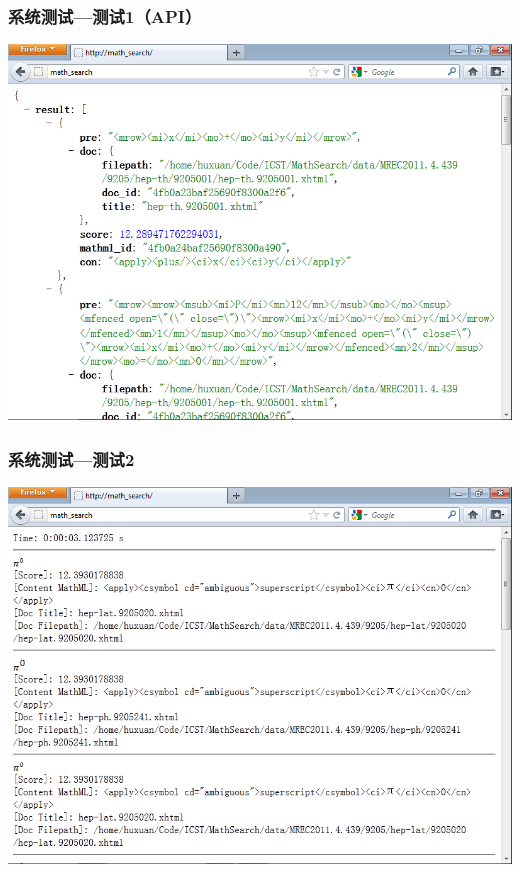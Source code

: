     \begin{frame}
        \frametitle{系统测试---测试1（API）}
        \begin{center}
            \includegraphics[width=.7\paperwidth]{pic/test1_api.png}
        \end{center}
    \end{frame}

    \begin{frame}
        \frametitle{系统测试---测试2}
        \begin{center}
            \includegraphics[width=.7\paperwidth]{pic/test2.png}
        \end{center}
    \end{frame}

